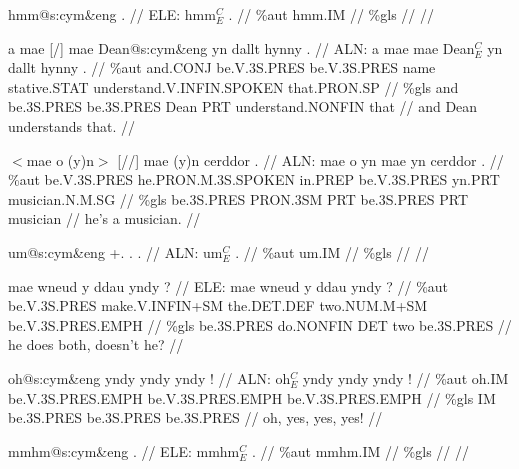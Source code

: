 \documentclass[a4paper,10pt]{article}
\begin{document}
\ex
\begingl[lingstyle=gergl]
\glchat hmm@s:cym\&eng . //
\glsurface ELE:  hmm$^{C}_{E}$ .  //
\glauto \%aut  hmm{\scriptsize .IM}   //
\glmanual \%gls     //
\gleng  //
\endgl
\xe

\ex
\begingl[lingstyle=gergl]
\glchat a mae [/] mae Dean@s:cym\&eng yn dallt hynny . //
\glsurface ALN:  a mae mae Dean$^{C}_{E}$ yn dallt hynny .  //
\glauto \%aut  and{\scriptsize .CONJ} be{\scriptsize .V.3S.PRES} be{\scriptsize .V.3S.PRES} name stative{\scriptsize .STAT} understand{\scriptsize .V.INFIN.SPOKEN} that{\scriptsize .PRON.SP}   //
\glmanual \%gls  and be{\scriptsize .3S.PRES} be{\scriptsize .3S.PRES} Dean PRT understand{\scriptsize .NONFIN} that   //
\gleng and Dean understands that. //
\endgl
\xe

\ex
\begingl[lingstyle=gergl]
\glchat $<$mae o (y)n$>$ [//] mae (y)n cerddor . //
\glsurface ALN:  mae o yn mae yn cerddor .  //
\glauto \%aut  be{\scriptsize .V.3S.PRES} he{\scriptsize .PRON.M.3S.SPOKEN} in{\scriptsize .PREP} be{\scriptsize .V.3S.PRES} yn{\scriptsize .PRT} musician{\scriptsize .N.M.SG}   //
\glmanual \%gls  be{\scriptsize .3S.PRES} PRON{\scriptsize .3SM} PRT be{\scriptsize .3S.PRES} PRT musician   //
\gleng he's a musician. //
\endgl
\xe

\ex
\begingl[lingstyle=gergl]
\glchat um@s:cym\&eng +. . . //
\glsurface ALN:  um$^{C}_{E}$ .  //
\glauto \%aut  um{\scriptsize .IM}   //
\glmanual \%gls     //
\gleng  //
\endgl
\xe

\ex
\begingl[lingstyle=gergl]
\glchat mae wneud y ddau yndy ? //
\glsurface ELE:  mae wneud y ddau yndy ?  //
\glauto \%aut  be{\scriptsize .V.3S.PRES} make{\scriptsize .V.INFIN+SM} the{\scriptsize .DET.DEF} two{\scriptsize .NUM.M+SM} be{\scriptsize .V.3S.PRES.EMPH}   //
\glmanual \%gls  be{\scriptsize .3S.PRES} do{\scriptsize .NONFIN} DET two be{\scriptsize .3S.PRES}   //
\gleng he does both, doesn't he? //
\endgl
\xe

\ex
\begingl[lingstyle=gergl]
\glchat oh@s:cym\&eng yndy yndy yndy ! //
\glsurface ALN:  oh$^{C}_{E}$ yndy yndy yndy !  //
\glauto \%aut  oh{\scriptsize .IM} be{\scriptsize .V.3S.PRES.EMPH} be{\scriptsize .V.3S.PRES.EMPH} be{\scriptsize .V.3S.PRES.EMPH}   //
\glmanual \%gls  IM be{\scriptsize .3S.PRES} be{\scriptsize .3S.PRES} be{\scriptsize .3S.PRES}   //
\gleng oh, yes, yes, yes! //
\endgl
\xe

\ex
\begingl[lingstyle=gergl]
\glchat mmhm@s:cym\&eng . //
\glsurface ELE:  mmhm$^{C}_{E}$ .  //
\glauto \%aut  mmhm{\scriptsize .IM}   //
\glmanual \%gls     //
\gleng  //
\endgl
\xe
\end{document}
